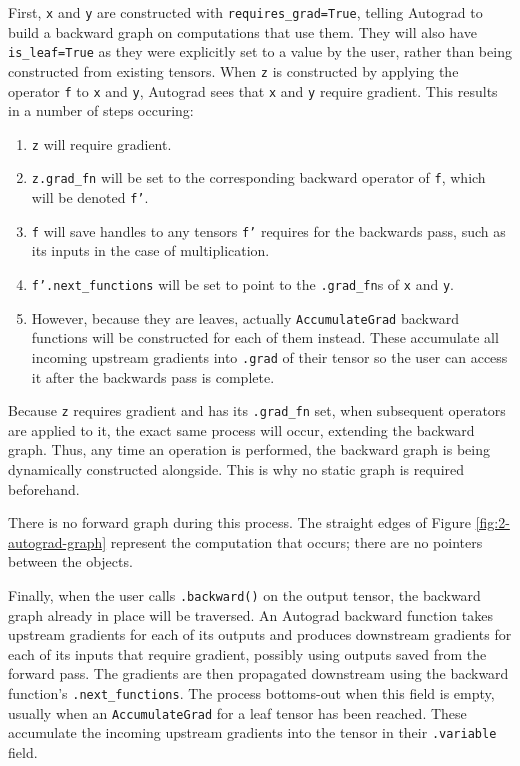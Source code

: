 First, \texttt{x} and \texttt{y} are constructed with \texttt{requires\_grad=True},
 telling Autograd to build a backward graph on computations that use them.
They will also have \texttt{is\_leaf=True} as they were explicitly set to a value by the user, rather than being constructed from existing tensors.
When \texttt{z} is constructed by applying the operator \texttt{f} to \texttt{x} and \texttt{y}, Autograd sees that \texttt{x} and \texttt{y} require gradient.
This results in a number of steps occuring:
\begin{enumerate}[topsep=0.1em]
    \item \texttt{z} will require gradient.
    \item \texttt{z.grad\_fn} will be set to the corresponding backward operator of \texttt{f}, which will be denoted \texttt{f'}.
    \item \texttt{f} will save handles to any tensors \texttt{f'} requires for the backwards pass, such as its inputs in the case of multiplication.
    \item \texttt{f'.next\_functions} will be set to point to the \texttt{.grad\_fn}s of \texttt{x} and \texttt{y}.
    \item However, because they are leaves, actually \texttt{AccumulateGrad} backward functions will be constructed for each of them instead.
    These accumulate all incoming upstream gradients into \texttt{.grad} of their tensor so the user can access it after the backwards pass is complete.
\end{enumerate}
Because \texttt{z} requires gradient and has its \texttt{.grad\_fn} set, when subsequent operators are applied to it, the exact same process will occur, extending the backward graph.
Thus, any time an operation is performed, the backward graph is being dynamically constructed alongside.
This is why no static graph is required beforehand.

There is no forward graph during this process.
The straight edges of Figure \ref{fig:2-autograd-graph} represent the computation that occurs; there are no pointers between the objects.

Finally, when the user calls \texttt{.backward()} on the output tensor, the backward graph already in place will be traversed.
An Autograd backward function takes upstream gradients for each of its outputs and produces downstream gradients for each of its inputs that require gradient, possibly using outputs saved from the forward pass.
The gradients are then propagated downstream using the backward function's \texttt{.next\_functions}.
The process bottoms-out when this field is empty, usually when an \texttt{AccumulateGrad} for a leaf tensor has been reached.
These accumulate the incoming upstream gradients into the tensor in their \texttt{.variable} field.

